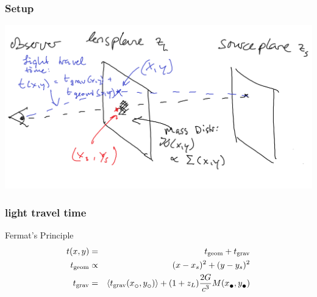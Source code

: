 \documentclass[aspectratio=1610]{beamer}
\newcommand{\subcirc}{{\lower.33ex\hbox{$\circ$}}}
\newcommand{\subbullet}{{\lower.33ex\hbox{$\bullet$}}}
\begin{document}
\begin{frame}
	\frametitle{Setup}
	\includegraphics[width=\textwidth]{imgs/sketch_arrtime}
\end{frame}


\begin{frame}
	\frametitle{light travel time}
	\begin{block}{Fermat’s Principle}
		\begin{eqnarray}
			t(x,y) &=& t_\text{geom} + t_\text{grav} \\
			t_\text{geom} &\propto & (x - x_s)^2 + (y-y_s)^2 \\
			t_\text{grav} &=& \left\langle t_\text{grav}(x_\subcirc,y_\subcirc) \right\rangle + (1+z_L) \frac{2G}{c^3} M(x_\subbullet,y_\subbullet)
		\end{eqnarray}
	\end{block}
\end{frame}



\end{document}
